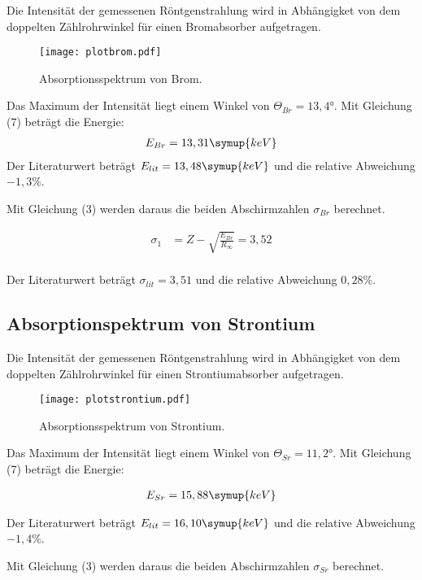Die Intensität der gemessenen Röntgenstrahlung wird in Abhängigket von dem doppelten Zählrohrwinkel für
einen Bromabsorber aufgetragen.

\begin{figure}
  \centering
  \texttt{[image: plotbrom.pdf]}
  \caption{Absorptionsspektrum von Brom.}
  \label{fig:plot}
\end{figure}

Das Maximum der Intensität liegt einem Winkel von $\Theta_{Br} = 13,4°$.
Mit Gleichung (7) beträgt die Energie:
\begin{align*}
  E_{Br} = 13,31 \symup{keV}
\end{align*}
Der Literaturwert beträgt $E_{lit} = 13,48 \symup{keV}$ und die relative Abweichung $-1,3\%$.

Mit Gleichung (3) werden daraus die beiden Abschirmzahlen $\sigma_{Br}$  berechnet.

\begin{align*}
  \sigma_1 &= Z - \sqrt{\frac{E_{Br}}{R_{\infty}}} = 3,52 \\
\end{align*}

Der Literaturwert beträgt $\sigma_{lit} = 3,51$ und die relative Abweichung $0,28\%$.

\subsection{Absorptionspektrum von Strontium}

Die Intensität der gemessenen Röntgenstrahlung wird in Abhängigket von dem doppelten Zählrohrwinkel für
einen Strontiumabsorber aufgetragen.

\begin{figure}
  \centering
  \texttt{[image: plotstrontium.pdf]}
  \caption{Absorptionsspektrum von Strontium.}
  \label{fig:plot}
\end{figure}

Das Maximum der Intensität liegt einem Winkel von $\Theta_{Sr} = 11,2°$.
Mit Gleichung (7) beträgt die Energie:

\begin{align*}
  E_{Sr} = 15,88 \symup{keV}
\end{align*}

Der Literaturwert beträgt $E_{lit} = 16,10 \symup{keV}$ und die relative Abweichung $-1,4\%$.


Mit Gleichung (3) werden daraus die beiden Abschirmzahlen $\sigma_{Sr}$  berechnet.

